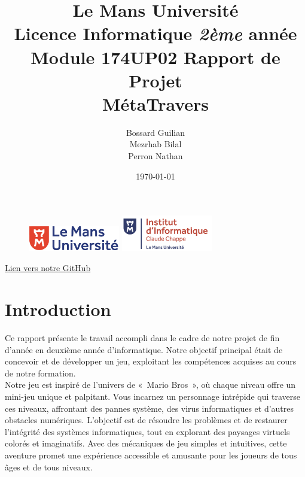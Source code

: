 \documentclass[12pt,a4paper]{article}
\begin{document}
    \begin{figure}
    
        \includegraphics[width=4cm]{images/logolemansU.png}
        \hspace{150pt}
        \includegraphics[width=4cm]{images/logo_IC2.png}
        
    \end{figure}
    
    \title{
        \color{blue}\textbf{Le Mans Université}\\
        \color{black}Licence Informatique \textit{2ème} année\\
        Module 174UP02 Rapport de Projet\\
        \textbf{MétaTravers}
    }
    
    \author{Bossard Guilian\\Mezrhab Bilal\\Perron Nathan}
    \date{\today}
    \maketitle
    \begin{center}
        \href{https://github.com/Slyolas/projetL2.git}{Lien vers notre GitHub}
    \end{center}
    \newpage

    \tableofcontents

    \newpage

    \section{Introduction}
        \tabto{1cm} Ce rapport présente le travail accompli dans le cadre de notre projet de fin d'année en deuxième année d'informatique. Notre objectif principal était de concevoir et de développer un jeu, exploitant les compétences acquises au cours de notre formation. \\
        
            \tabto{1cm} Notre jeu est inspiré de l'univers de «~Mario Bros~», où chaque niveau offre un mini-jeu unique et palpitant. Vous incarnez un personnage intrépide qui traverse ces niveaux, affrontant des pannes système, des virus informatiques et d'autres obstacles numériques. L'objectif est de résoudre les problèmes et de restaurer l'intégrité des systèmes informatiques, tout en explorant des paysages virtuels colorés et imaginatifs. Avec des mécaniques de jeu simples et intuitives, cette aventure promet une expérience accessible et amusante pour les joueurs de tous âges et de tous niveaux.\\\\
             
\end{document}
